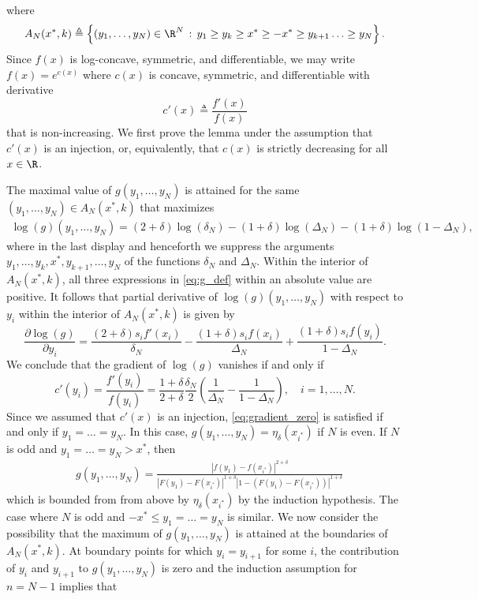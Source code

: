 where 
\[
A_N(x^*,k) \triangleq \left\{ (y_1,\ldots,y_N) \in \R^N\, : \, y_1 \ge y_k \ge x^* \ge -x^* \ge y_{k+1} \ldots \ge y_N
\right\}.
\]
%
Since $f(x)$ is log-concave, symmetric, and differentiable, we may write $f(x) = e^{c(x)}$ where $c(x)$ is concave, symmetric, and differentiable with derivative 
\[
c'(x) \triangleq \frac{f'(x)}{f(x)} 
\]
that is non-increasing. We first prove the lemma under the assumption that $c'(x)$ is an injection, or, equivalently, that $c(x)$ is strictly decreasing for all $x\in \R$. \par
%
The maximal value of $g(y_1,\ldots,y_N)$ is attained for the same $(y_1,\ldots,y_N) \in A_N(x^*,k)$ that maximizes
\begin{align*}
 \log(g)(y_1,\ldots, y_N) =  (2+\delta) \log \left( \delta_N  \right)  - (1+\delta) \log \left( \Delta_N  \right) - (1+\delta) \log \left(1 - \Delta_N \right),
\end{align*}
where in the last display and henceforth we suppress the arguments $y_1,\ldots,y_k,x^*,y_{k+1},\ldots, y_N$ of the functions $\delta_N$ and $\Delta_N$.
%
Within the interior of $A_N(x^*,k)$, all three expressions in \eqref{eq:g_def} within an absolute value are positive. It follows that partial derivative of $\log(g)(y_1,\ldots,y_N)$ with respect to $y_i$ within the interior of $A_N(x^*,k)$ is given by
\[
\frac{\partial \log(g)}{\partial y_i} = \frac{(2+\delta) s_i f'(x_i)}{\delta_N } -\frac{(1+\delta) s_i f(x_i)}{\Delta_N  } + \frac{(1+\delta)s_i f(y_i)}{1-\Delta_N }.
\]
We conclude that the gradient of $\log(g)$ vanishes if and only if
\begin{equation}
\label{eq:gradient_zero}
c'(y_i) = \frac{f'(y_i)}{f(y_i)} = \frac{1+\delta}{2+\delta} \frac{\delta_N}{2} \left( \frac{1}{\Delta_N} - \frac{1}{1-\Delta_N } \right),\quad i=1,\ldots,N.
\end{equation}
%
Since we assumed that $c'(x)$ is an injection, \eqref{eq:gradient_zero} is satisfied if and only if $y_1 = \ldots = y_N$. In this case, 
$g(y_1,\ldots,y_N) = \eta_\delta(x_{i^*})$  
if $N$ is even. If $N$ is odd and $y_1 = \ldots = y_N > x^*$, then 
\begin{align*}
& g(y_1,\ldots,y_N) = \frac{\left| f(y_1)-f(x_{i^*})  \right|^{2+\delta}} { 
\left|  F(y_1) - F(x_{i^*}) \right|^{1+ \delta} 
\left| 1 - (F(y_1) -F(x_{i^*})) \right|^{1+ \delta} } 
\end{align*} 
which is bounded from from above by $\eta_\delta(x_{i^*})$ by the induction hypothesis. The case where $N$ is odd and $-x^* \leq y_1 = \ldots = y_N$ is similar. 
%
We now consider the possibility that the maximum of $g(y_1,\ldots,y_N)$ is attained at the boundaries of $A_N(x^*,k)$. At boundary points for which $y_i = y_{i+1}$ for some $i$, the contribution of $y_i$ and $y_{i+1}$ to $g(y_1,\ldots,y_N)$ is zero and the induction assumption for $n=N-1$ implies that 
